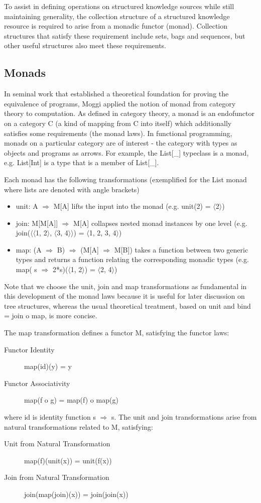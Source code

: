 \documentclass[runningheads]{llncs}
\begin{document}
To assist in defining operations on structured knowledge sources while still maintaining generality, the collection structure of a structured knowledge resource is required to arise from a monadic functor (monad). Collection structures that satisfy these requirement include sets, bags and sequences, but other useful structures also meet these requirements.

\subsection{Monads}
In seminal work that established a theoretical foundation for proving the equivalence of programs, Moggi\cite{moggi_notions_1991} applied the notion of monad from category theory\cite{MacLane1998} to computation.
As defined in category theory, a monad  is an endofunctor on a category C (a kind of mapping from C into itself) which additionally satisfies some requirements (the monad laws).
In functional programming, monads on a particular category are of interest - the category with types as objects and programs as arrows.
For example, the List[\_] typeclass is a monad, e.g. List[Int] is a type that is a member of List[\_].

Each monad has the following transformations (exemplified for the List monad where lists are denoted with angle brackets)
\begin{itemize}
\item unit: A $\Rightarrow$ M[A] lifts the input into the monad (e.g. unit(2) = $\langle$2$\rangle$)
\item join: M[M[A]] $\Rightarrow$ M[A] collapses nested monad instances by one level (e.g. join($\langle$$\langle$1, 2$\rangle$, $\langle$3, 4$\rangle$$\rangle$) = $\langle$1, 2, 3, 4$\rangle$)
\item map: (A $\Rightarrow$ B) $\Rightarrow$ (M[A] $\Rightarrow$ M[B]) takes a function between two generic types and returns a function relating the corresponding monadic types (e.g. map( s $\Rightarrow$ 2*s)($\langle$1, 2$\rangle$) = $\langle$2, 4$\rangle$)
\end{itemize}
Note that we choose the unit, join and map transformations\cite{Wadler1992} as fundamental in this development of the monad laws because it is useful for later discussion on tree structures, whereas the usual theoretical treatment, based on unit and bind = join o map, is more concise.

The map transformation defines a functor M, satisfying the functor laws:
\begin{description}
\item[Functor Identity] map(id)(y) = y
\item[Functor Associativity] map(f o g) = map(f) o map(g)
\end{description}
where id is identity function s $\Rightarrow$ s.
The unit and join transformations arise from natural transformations related to M, satisfying:
\begin{description}
\item[Unit from Natural Transformation] map(f)(unit(x)) = unit(f(x))
\item[Join from Natural Transformation] join(map(join)(x)) = join(join(x))
\end{description}
\end{document}
